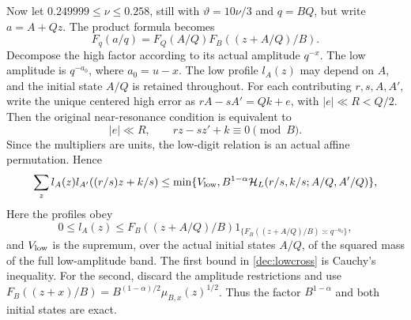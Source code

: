\documentclass[11pt,a4paper]{article}
\theoremstyle{paperplain}
\numberwithin{equation}{section}
\begin{document}
Now let $0.249999\le\nu\le0.258$, still with
$\vartheta=10\nu/3$ and $q=BQ$, but write $a=A+Qz$.
The product formula becomes
\begin{equation}\label{dec:reversefactor}
 F_q(a/q)=F_Q(A/Q)F_B((z+A/Q)/B).
\end{equation}
Decompose the high factor according to its actual amplitude $q^{-x}$.
The low amplitude is $q^{-a_0}$, where $a_0=u-x$.
The low profile $l_A(z)$ may depend on $A$, and the initial state
$A/Q$ is retained throughout. For each contributing $r,s,A,A'$,
write the unique centered high error as
$rA-sA'=Qk+e$, with $|e|\ll R<Q/2$.
Then the original near-resonance condition is equivalent to
\begin{equation}\label{dec:actualreversecarry}
 |e|\ll R,\qquad rz-sz'+k\equiv0\pmod B.
\end{equation}
Since the multipliers are units, the low-digit relation is an actual
affine permutation. Hence
\begin{equation}\label{dec:lowcross}
 \sum_zl_A(z)l_{A'}((r/s)z+k/s)
 \le\min\{V_{
 \rm low},B^{1-\alpha}
 \mathcal H_L(r/s,k/s;A/Q,A'/Q)\},
\end{equation}
Here the profiles obey
\[
 0\le l_A(z)\le F_B((z+A/Q)/B)
       1_{\{F_B((z+A/Q)/B)\asymp q^{-a_0}\}},
\]
and $V_{\rm low}$ is the supremum, over the actual initial states
$A/Q$, of the squared mass of the full low-amplitude band.
The first bound in \eqref{dec:lowcross} is Cauchy's inequality.
For the second, discard the amplitude restrictions and use
$F_B((z+x)/B)=B^{(1-\alpha)/2}\mu_{B,x}(z)^{1/2}$.
Thus the factor $B^{1-\alpha}$ and both initial states are exact.
\end{document}

